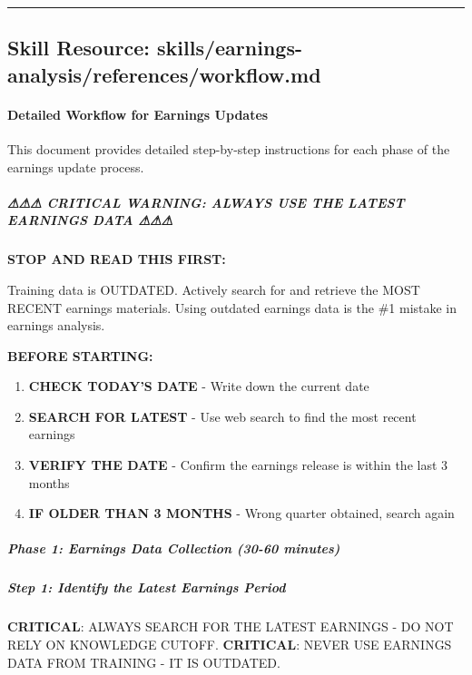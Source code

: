 \documentclass[11pt]{article}
\begin{document}
\vspace{0.8em}\hrule\vspace{0.8em}

\subsection{Skill Resource: skills/earnings-analysis/references/workflow.md}\label{file:skills-earnings-analysis-references-workflow-md}

\paragraph{Detailed Workflow for Earnings Updates}\mbox{}\par

This document provides detailed step-by-step instructions for each phase of the earnings update process.


\subparagraph{⚠⚠⚠ CRITICAL WARNING: ALWAYS USE THE LATEST EARNINGS DATA ⚠⚠⚠}\mbox{}\par

\textbf{STOP AND READ THIS FIRST:}


Training data is OUTDATED. Actively search for and retrieve the MOST RECENT earnings materials. Using outdated earnings data is the \#1 mistake in earnings analysis.


\textbf{BEFORE STARTING:}

\begin{enumerate}[leftmargin=*,itemsep=2pt,topsep=2pt]
\item {} \textbf{CHECK TODAY'S DATE} - Write down the current date
\item {} \textbf{SEARCH FOR LATEST} - Use web search to find the most recent earnings
\item {} \textbf{VERIFY THE DATE} - Confirm the earnings release is within the last 3 months
\item {} \textbf{IF OLDER THAN 3 MONTHS} - Wrong quarter obtained, search again
\end{enumerate}

\subparagraph{Phase 1: Earnings Data Collection (30-60 minutes)}\mbox{}\par

\subparagraph{Step 1: Identify the Latest Earnings Period}\mbox{}\par

\textbf{CRITICAL}: ALWAYS SEARCH FOR THE LATEST EARNINGS - DO NOT RELY ON KNOWLEDGE CUTOFF. \textbf{CRITICAL}: NEVER USE EARNINGS DATA FROM TRAINING - IT IS OUTDATED.
\end{document}
